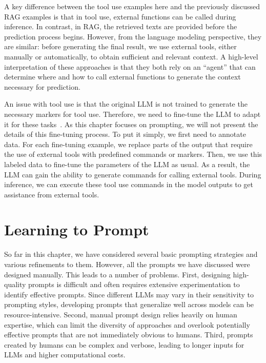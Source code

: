 A key difference between the tool use examples here and the previously discussed RAG examples is that in tool use, external functions can be called during inference. In contrast, in RAG, the retrieved texts are provided before the prediction process begins. However, from the language modeling perspective, they are similar: before generating the final result, we use external tools, either manually or automatically, to obtain sufficient and relevant context. A high-level interpretation of these approaches is that they both rely on an ``agent'' that can determine where and how to call external functions to generate the context necessary for prediction.

An issue with tool use is that the original LLM is not trained to generate the necessary markers for tool use. Therefore, we need to fine-tune the LLM to adapt it for these tasks~\cite{schick-etal:2024toolformer}. As this chapter focuses on prompting, we will not present the details of this fine-tuning process. To put it simply, we first need to annotate data. For each fine-tuning example, we replace parts of the output that require the use of external tools with predefined commands or markers. Then, we use this labeled data to fine-tune the parameters of the LLM as usual. As a result, the LLM can gain the ability to generate commands for calling external tools. During inference, we can execute these tool use commands in the model outputs to get assistance from external tools.


\section{Learning to Prompt}

\noindent So far in this chapter, we have considered several basic prompting strategies and various refinements to them. However, all the prompts we have discussed were designed manually. This leads to a number of problems. First, designing high-quality prompts is difficult and often requires extensive experimentation to identify effective prompts. Since different LLMs may vary in their sensitivity to prompting styles, developing prompts that generalize well across models can be resource-intensive. Second, manual prompt design relies heavily on human expertise, which can limit the diversity of approaches and overlook potentially effective prompts that are not immediately obvious to humans. Third, prompts created by humans can be complex and verbose, leading to longer inputs for LLMs and higher computational costs.

